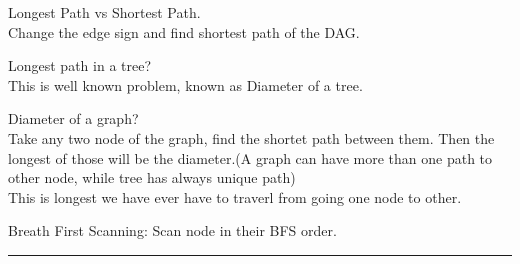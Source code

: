 Longest Path vs Shortest Path.\\
Change the edge sign and find shortest path of the DAG.

Longest path in a tree?\\
This is well known problem, known as Diameter of a tree.


Diameter of a graph?\\
Take any two node of the graph, find the shortet path between them. Then the longest of those will be the diameter.(A graph can have more than one path to other node, while tree has always unique path)
\\This is longest we have ever have to traverl from going one node to other.

Breath First Scanning: Scan node in their BFS order.

\rule{\linewidth}{0.2em}